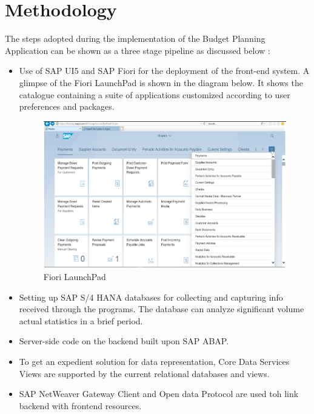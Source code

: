 \section[Methodology]{\textbf{Methodology}}
The steps adopted during the implementation of the Budget Planning Application can
be shown as a three stage pipeline as discussed below :

\begin{itemize}
\item Use of SAP UI5 and SAP Fiori for the deployment of the front-end system. A glimpse
 of the Fiori LaunchPad is shown in the diagram below. It shows the catalogue
 containing a suite of applications customized according to user preferences and
 packages.
 
\begin{figure}[H]
    \centering
        \includegraphics[scale=0.5]{Chapter1/Figures/fiori1.png}	
        \caption{Fiori LaunchPad} 
        \label{fig:fiorilaunchpad}
\end{figure}
    
\item Setting up SAP S/4 HANA databases for collecting and capturing info received
    through the programs. The database can analyze significant volume actual statistics
    in a brief period.
\item Server-side code on the backend built upon SAP ABAP.
\item  To get an expedient solution for data representation, Core Data Services Views are
    supported by the current relational databases and views.
\item  SAP NetWeaver Gateway Client and Open data Protocol are used toh link
    backend with frontend resources.
\end{itemize}

